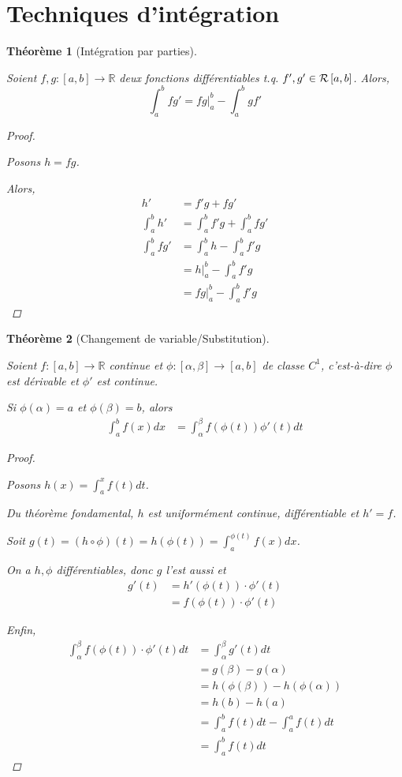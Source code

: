 \documentclass{report}
\newcommand*{\dint}[3]{\displaystyle\int_{#1}^{#2}#3}
\newcommand*{\reels}{\mathbb{R}}
\newtheorem*{thm}{Th\'eor\`eme}
\theoremstyle{definition}
\theoremstyle{remark}
\begin{document}
	\section{Techniques d'int\'egration}
	\begin{thm}[Int\'egration par parties]~

		Soient $f,g:[a,b] \to \reels$ deux fonctions diff\'erentiables t.q. $f',g' \in \riemann$. Alors,
		\[
		\dint{a}{b}{f}g' = \left. fg \right|_a^b-\dint{a}{b}{gf'}
		\]
		\begin{proof}~

			Posons $h=fg$.

			Alors,
			\begin{align*}
				h'&= f'g + fg'\\
				\dint{a}{b}{h'}&= \dint{a}{b}{f'g} + \dint{a}{b}{fg'}\\
				\dint{a}{b}{fg'}&= \dint{a}{b}{h} - \dint{a}{b}{f'g}\\
				&= \left. h \right|_a^b - \dint{a}{b}{f'g}\\
				&= \left. fg \right|_a^b - \dint{a}{b}{f'g}
			\end{align*}
		\end{proof}
	\end{thm}
	\begin{thm}[Changement de variable/Substitution]~

		Soient $f:[a,b] \to \reels$ continue et $\phi:[\alpha,\beta] \to [a,b]$ de classe $C^1$, c'est-\`a-dire $\phi$ est d\'erivable et $\phi'$ est continue.

		Si $\phi(\alpha)=a$ et $\phi(\beta)=b$, alors
		\begin{align*}
			\dint{a}{b}{f(x) dx}&= \dint{\alpha}{\beta}{f(\phi(t))\phi'(t) dt}
		\end{align*}
		\begin{proof}~

			Posons $h(x)=\dint{a}{x}{f(t) dt}$.

			Du th\'eor\`eme fondamental, $h$ est uniform\'ement continue, diff\'erentiable et $h'=f$.

			Soit $g(t)=(h \circ \phi)(t) = h(\phi(t)) = \dint{a}{\phi(t)}{f(x) dx}$.

			On a $h,\phi$ diff\'erentiables, donc $g$ l'est aussi et
			\begin{align*}
				g'(t)&= h'(\phi(t)) \cdot \phi'(t)\\
				&= f(\phi(t)) \cdot \phi'(t)
			\end{align*}

			Enfin,
			\begin{align*}
				\dint{\alpha}{\beta}{f(\phi(t)) \cdot \phi'(t) dt}&= \dint{\alpha}{\beta}{g'(t) dt}\\
				&= g(\beta)-g(\alpha)\\
				&= h(\phi(\beta)) - h(\phi(\alpha))\\
				&= h(b)-h(a)\\
				&= \dint{a}{b}{f(t) dt} - \dint{a}{a}{f(t) dt}\\
				&= \dint{a}{b}{f(t) dt}
			\end{align*}
		\end{proof}
	\end{thm}
\end{document}
